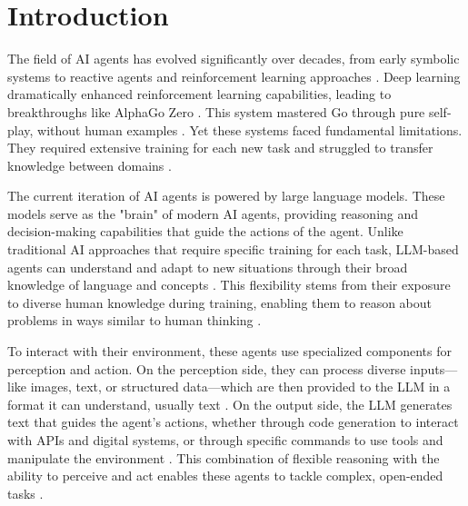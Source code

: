 \documentclass{article}
\begin{document}


\section{Introduction}

The field of AI agents has evolved significantly over decades, from early symbolic systems to reactive agents and reinforcement learning approaches \cite{Bengio1995,Botvinick2017}. Deep learning dramatically enhanced reinforcement learning capabilities, leading to breakthroughs like AlphaGo Zero \cite{Clark2014, Mnih2013, Silver2017}. This system mastered Go through pure self-play, without human examples \cite{Silver2017}. Yet these systems faced fundamental limitations. They required extensive training for each new task \cite{Marcus2018, Bergstra2012} and struggled to transfer knowledge between domains \cite{Goodfellow2013,Marcus2018}.

The current iteration of AI agents is powered by large language models. These models serve as the "brain" of modern AI agents, providing reasoning and decision-making capabilities that guide the actions of the agent. Unlike traditional AI approaches that require specific training for each task, LLM-based agents can understand and adapt to new situations through their broad knowledge of language and concepts \cite{Vaswani2017,Brown2020}. This flexibility stems from their exposure to diverse human knowledge during training, enabling them to reason about problems in ways similar to human thinking \cite{Kaplan2020,Ziegler2019}.

To interact with their environment, these agents use specialized components for perception and action. On the perception side, they can process diverse inputs—like images, text, or structured data—which are then provided to the LLM in a format it can understand, usually text \cite{Baltrušaitis2017}. On the output side, the LLM generates text that guides the agent's actions, whether through code generation to interact with APIs and digital systems, or through specific commands to use tools and manipulate the environment \cite{Ahuja2019}. This combination of flexible reasoning with the ability to perceive and act enables these agents to tackle complex, open-ended tasks \cite{Nyatsanga2023, Lee2022}.
\end{document}
